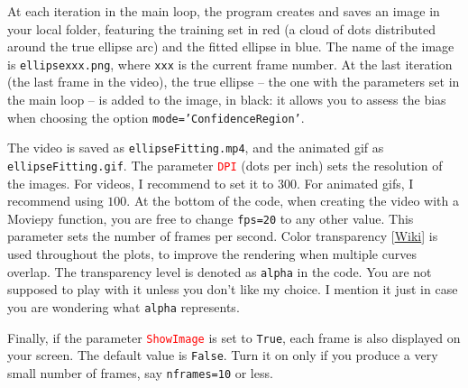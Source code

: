 \documentclass[oneside,10pt]{book}
\begin{document}
\noindent At each iteration in the main loop, the program creates and saves an image in your local folder, featuring the training set in red (a cloud of dots distributed around the true ellipse arc) and the fitted ellipse in blue. The name of the image is
\texttt{ellipsexxx.png}, where \texttt{xxx} is
 the current frame number.  At the last iteration (the last frame in the video), the true ellipse -- the one with the parameters set in the main loop -- is added to the image, in black:  it allows you to assess the bias when choosing
 the option \texttt{mode='ConfidenceRegion'}.

The video is saved as
  \texttt{ellipseFitting.mp4}, and the animated gif as \texttt{ellipseFitting.gif}.
The parameter \textcolor{red}{\texttt{DPI}} (dots per inch) sets the resolution of the images. For videos, I recommend to set it to $300$. For animated gifs, I recommend using $100$. At the bottom of the code, when creating the video with a Moviepy function, you are free
 to change \texttt{fps=20} to any other value. This parameter sets the number of frames per second.
\textcolor{index}{Color transparency} [\href{https://en.wikipedia.org/wiki/Alpha_compositing}{Wiki}] is used throughout the plots, to improve the rendering when multiple curves overlap. The transparency level is denoted as \texttt{alpha} in the code. You are not supposed to play with it unless
 you don't like my choice. I mention it just in case you are wondering what \texttt{alpha} represents.

Finally, if the parameter \textcolor{red}{\texttt{ShowImage}} is set to \texttt{True}, each
 frame is also displayed on your screen. The default value is \texttt{False}. Turn it on only
 if you produce a very small number of frames, say \texttt{nframes=10} or less.\\
\end{document}
